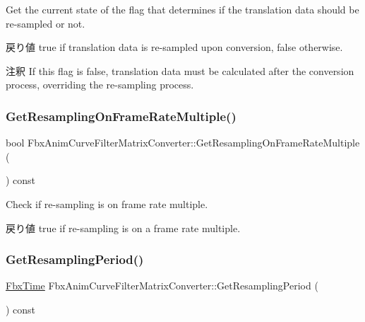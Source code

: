 Get the current state of the flag that determines if the translation data should be re-\/sampled or not. \begin{DoxyReturn}{戻り値}
{\ttfamily true} if translation data is re-\/sampled upon conversion, {\ttfamily false} otherwise. 
\end{DoxyReturn}
\begin{DoxyRemark}{注釈}
If this flag is {\ttfamily false}, translation data must be calculated after the conversion process, overriding the re-\/sampling process. 
\end{DoxyRemark}
\mbox{\label{class_fbx_anim_curve_filter_matrix_converter_a6f5d905229e996ddccfe96e2cd4454e3}} 
\subsubsection{\texorpdfstring{Get\+Resampling\+On\+Frame\+Rate\+Multiple()}{GetResamplingOnFrameRateMultiple()}}
{\footnotesize\ttfamily bool Fbx\+Anim\+Curve\+Filter\+Matrix\+Converter\+::\+Get\+Resampling\+On\+Frame\+Rate\+Multiple (\begin{DoxyParamCaption}{ }\end{DoxyParamCaption}) const}

Check if re-\/sampling is on frame rate multiple. \begin{DoxyReturn}{戻り値}
{\ttfamily true} if re-\/sampling is on a frame rate multiple. 
\end{DoxyReturn}
\mbox{\label{class_fbx_anim_curve_filter_matrix_converter_a30366999bdf8a54362cb07415cb09d67}} 
\subsubsection{\texorpdfstring{Get\+Resampling\+Period()}{GetResamplingPeriod()}}
{\footnotesize\ttfamily \hyperlink{class_fbx_time}{Fbx\+Time} Fbx\+Anim\+Curve\+Filter\+Matrix\+Converter\+::\+Get\+Resampling\+Period (\begin{DoxyParamCaption}{ }\end{DoxyParamCaption}) const}


